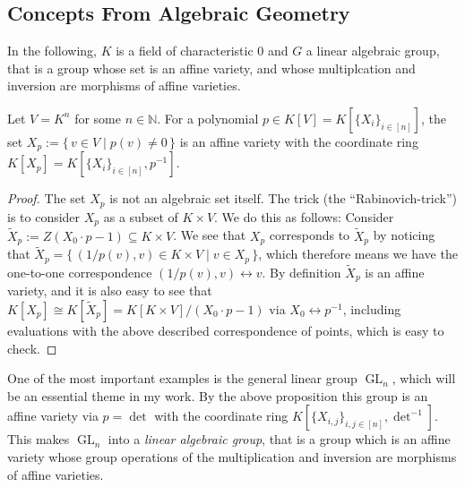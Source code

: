 \subsection{Concepts From Algebraic Geometry}

In the following, $K$ is a field of characteristic $0$ and $G$ a linear algebraic group, that is a group whose set is an affine variety, and whose multiplcation and inversion are morphisms of affine varieties.

\begin{proposition}\label{rabbi}
  Let $V = K^n$ for some $n \in \mathbb{N}$.
  For a polynomial $p \in K[V] = K[\{X_i\}_{i\in[n]}]$, the set $ X_p := \{\, v \in V \mid p(v) \neq 0 \,\}$ is an affine variety with the coordinate ring $K[X_p] = K[\{X_i\}_{i \in [n]}, p^{-1}]$.
\end{proposition}

\begin{proof}
  The set $X_p$ is not an algebraic set itself.
  The trick (the ``Rabinovich-trick'') is to consider $X_p$ as a subset of $K \times V$.
  We do this as follows:
  Consider $\tilde{X}_p := Z \left( X_0 \cdot p -1 \right) \subseteq K \times V$.
  We see that $X_p$ corresponds to $\tilde{X}_p$ by noticing that $\tilde{X}_p = \{\, (1/p(v), v) \in K \times V \mid v \in X_p \,\}$, which therefore means we have the one-to-one correspondence $(1/p(v),v) \leftrightarrow v$.
  By definition $\tilde{X}_p$ is an affine variety, and it is also easy to see that $K[X_p] \cong K[\tilde{X}_p] = K[K\times V] / (X_0 \cdot p -1)$ via $X_0 \leftrightarrow p^{-1}$, including evaluations with the above described correspondence of points, which is easy to check.
\end{proof}

\begin{example}
  One of the most important examples is the general linear group $\operatorname{GL}_n$, which will be an essential theme in my work.
  By the above proposition this group is an affine variety via $p = \operatorname{det}$ with the coordinate ring $K[\{X_{i,j}\}_{i,j \in [n]}, \operatorname{det}^{-1}]$.
  This makes $\operatorname{GL}_n$ into a \textit{linear algebraic group}, that is a group which is an affine variety whose group operations of the multiplication and inversion are morphisms of affine varieties.
\end{example}


